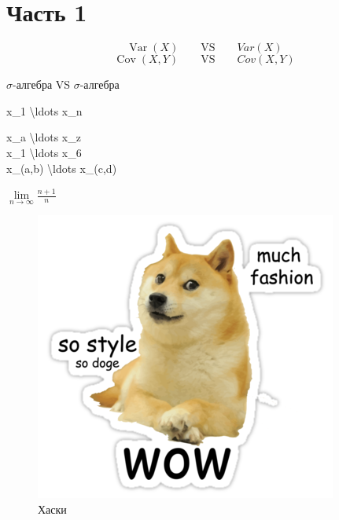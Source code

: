 \documentclass[12pt, a4paper]{article}
\theoremstyle{plain}              %
\theoremstyle{definition}         %
\DeclareMathOperator{\Var}{Var}
\DeclareMathOperator{\Cov}{Cov}
\begin{document}
\section{Часть 1}

\[\Var(X) \qquad \text{VS} \qquad Var(X) \]
\[\Cov(X,Y) \qquad \text{VS} \qquad Cov(X,Y) \]

\begin {center}

\def\s{\ensuremath{\sigma}}
$\sigma$-алгебра \quad VS \quad \s-алгебра 


\newcommand{\co}{x\_1  \backslash ldots x\_n}
\co

\newcommand{\com}[2]{x\_#1  \backslash ldots x\_#2}
\com{a}{z} \\
\com{1}{6} \\
\com{(a,b)}{(c,d)}

\end{center}


\def\tk{
\begin{tikzpicture}
\draw[blue,fill=blue](2,2) circle [radius = 0.1];
\end{tikzpicture}
}



\newcommand{\llim}[2]{\lim\limits_{n \to #1} #2}
$\llim {\infty} {\frac{n+1}{n}}$


\renewcommand\thefigure{\thesection.\arabic{figure}}    
\setcounter{figure}{0}   
 
\begin{figure}[h!]
\begin{center}
\includegraphics[width=0.3\textheight]{doge.png}
\caption{Хаски}
\end{center}
\end{figure}
\end{document}
